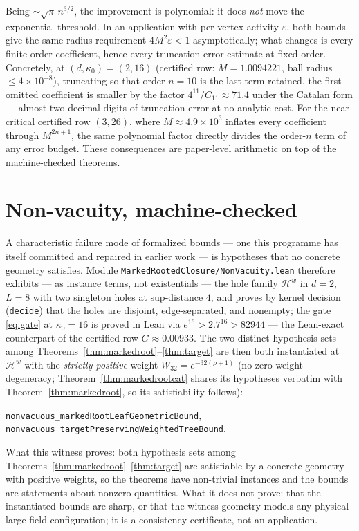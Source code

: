 \documentclass[11pt]{article}
\newcommand{\lean}[1]{\texttt{#1}}
\newcommand{\holes}{\mathcal{H}}
\begin{document}
Being $\sim \sqrt{\pi}\,n^{3/2}$, the improvement is polynomial: it
does \emph{not} move the exponential threshold.  In an application
with per-vertex activity $\varepsilon$, both bounds give the same
radius requirement $4M^2\varepsilon < 1$ asymptotically; what changes
is every finite-order coefficient, hence every truncation-error
estimate at fixed order.  Concretely, at $(d, \kappa_0) = (2, 16)$
(certified row: $M = 1.0094221$, ball radius $\le 4 \times 10^{-8}$),
truncating so that order $n = 10$ is the last term retained, the
first omitted coefficient is smaller by the factor $4^{11}/C_{11}
\approx 71.4$ under the Catalan form --- almost two decimal digits of
truncation error at no analytic cost.  For the near-critical
certified row $(3, 26)$, where $M \approx 4.9 \times 10^3$ inflates
every coefficient through $M^{2n+1}$, the same polynomial factor
directly divides the order-$n$ term of any error budget.  These
consequences are paper-level arithmetic on top of the machine-checked
theorems.

\section{Non-vacuity, machine-checked}\label{sec:nonvacuity}

A characteristic failure mode of formalized bounds --- one this
programme has itself committed and repaired in earlier work --- is
hypotheses that no concrete geometry satisfies.  Module
\lean{MarkedRootedClosure/NonVacuity.lean} therefore exhibits --- as
instance terms, not existentials --- the hole family $\holes^{w}$ in
$d = 2$, $L = 8$ with two singleton holes at sup-distance $4$, and
proves by kernel decision (\lean{decide}) that the holes are
disjoint, edge-separated, and nonempty; the gate \eqref{eq:gate} at
$\kappa_0 = 16$ is proved in Lean via $e^{16} > 2.7^{16} > 82944$ ---
the Lean-exact counterpart of the certified row $G \approx 0.00933$.
The two distinct hypothesis sets among
Theorems~\ref{thm:markedroot}--\ref{thm:target} are then both
instantiated at $\holes^{w}$ with the \emph{strictly positive} weight
$W_{32} = e^{-32(\rho+1)}$ (no zero-weight degeneracy;
Theorem~\ref{thm:markedrootcat} shares its hypotheses verbatim with
Theorem~\ref{thm:markedroot}, so its satisfiability follows):
\begin{center}\small
\lean{nonvacuous\_markedRootLeafGeometricBound},\quad
\lean{nonvacuous\_targetPreservingWeightedTreeBound}.
\end{center}

What this witness proves: both hypothesis sets among
Theorems~\ref{thm:markedroot}--\ref{thm:target} are satisfiable by a
concrete geometry with positive weights, so the theorems have
non-trivial instances and the bounds are statements about nonzero
quantities.  What it does not prove: that the instantiated bounds are
sharp, or that the witness geometry models any physical large-field
configuration; it is a consistency certificate, not an application.
\end{document}
